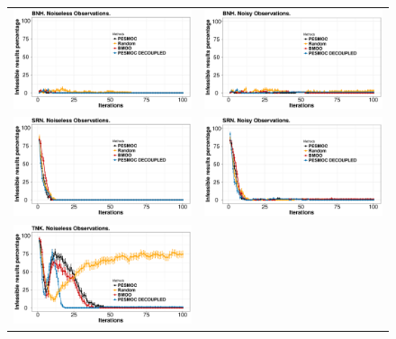 \begin{figure}[htb]
        \begin{tabular}{cc}
                \vspace{-.2cm}
                \includegraphics[width=0.475\linewidth]{../Figures/pesmoc/benchmark/BNH_zeros_noiseless} &
                \includegraphics[width=0.475\linewidth]{../Figures/pesmoc/benchmark/BNH_zeros_noisy} \\
                \includegraphics[width=0.475\linewidth]{../Figures/pesmoc/benchmark/SRN_zeros_noiseless} &
                \includegraphics[width=0.475\linewidth]{../Figures/pesmoc/benchmark/SRN_zeros_noisy} \\
                \includegraphics[width=0.475\linewidth]{../Figures/pesmoc/benchmark/TNK_zeros_noiseless} &

\end{tabular}
\end{figure}
